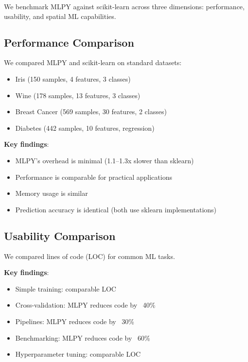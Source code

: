 \documentclass[twoside,11pt]{article}
\begin{document}
We benchmark MLPY against scikit-learn across three dimensions: performance,
usability, and spatial ML capabilities.

\subsection{Performance Comparison}


We compared MLPY and scikit-learn on standard datasets:
\begin{itemize}
  \item Iris (150 samples, 4 features, 3 classes)
  \item Wine (178 samples, 13 features, 3 classes)
  \item Breast Cancer (569 samples, 30 features, 2 classes)
  \item Diabetes (442 samples, 10 features, regression)
\end{itemize}

\textbf{Key findings}:
\begin{itemize}
  \item MLPY's overhead is minimal (1.1--1.3x slower than sklearn)
  \item Performance is comparable for practical applications
  \item Memory usage is similar
  \item Prediction accuracy is identical (both use sklearn implementations)
\end{itemize}


\subsection{Usability Comparison}

We compared lines of code (LOC) for common ML tasks.


\textbf{Key findings}:
\begin{itemize}
  \item Simple training: comparable LOC
  \item Cross-validation: MLPY reduces code by ~40\%
  \item Pipelines: MLPY reduces code by ~30\%
  \item Benchmarking: MLPY reduces code by ~60\%
  \item Hyperparameter tuning: comparable LOC
\end{itemize}
\end{document}
